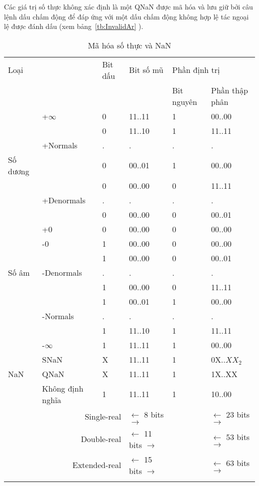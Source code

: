 	Các giá trị số thực không xác định là một QNaN được mã hóa và lưu giữ bởi câu lệnh dấu chấm động để đáp ứng với một dấu chấm động không hợp lệ tác ngoại lệ được đánh dấu (xem bảng~\ref{tb:InvalidAr} ).	
	\newpage
		\begin{longtable}{|l|l|l|l|l|m{2.5cm}|}
			\hline
				\multicolumn{2}{|l|}{Loại} & Bit dấu & Bit số mũ & \multicolumn{2}{l|}{Phần định trị} \\
				\cline{5-6}
				\multicolumn{2}{|l|}{} & & & Bit nguyên & Phần thập phân \\
			\hline
				 & +$\mathbb{\infty}$ & 0 & 11..11 & 1 & 00..00 \\
				\cline{2-6}
				  & & 0 & 11..10 & 1 & 11..11 \\
				  & +Normals & . & .& . & . \\				 
				 Số dương & & 0 & 00..01 & 1 & 00..00 \\
				 	\cline{2-6}
				  & & 0 & 00..00 & 0 & 11..11 \\
				  & +Denormals& . & .& . & . \\				
				  & & 0 & 00..00 & 0 & 00..01 \\
				  \cline{2-6}
				  & +0 & 0& 00..00 & 0 & 00..00 \\
			\hline			
				  & -0 & 1 & 00..00 & 0 & 00..00 \\
				\cline{2-6}
				  & & 1 & 00..00 & 0 & 00..01 \\
				  Số âm& -Denormals& . & .& . & . \\				  
				  & & 1 & 00..00 & 0 & 11..11 \\
				\cline{2-6}
				  & & 1 & 00..01 & 1 & 00..00 \\
				  & -Normals & . & .& . & . \\				 
				  & & 1 & 11..10 & 1 & 11..11 \\
				 \cline{2-6}
				  & -$\mathbb{\infty}$ & 1 & 11..11 & 1 & 00..00 \\
			\hline			
				  & SNaN & X & 11..11 & 1&  0X..$XX_2$ \\
				\cline{2-6}
				 NaN & QNaN & X & 11..11 & 1& 1X..XX\\
				\cline{2-6}
				  & Không định nghĩa &1 & 11..11& 1  &10..00 \\
			\hline
				\multicolumn{3}{r|}{Single-real} & $\leftarrow$ 8 bits $\to $ & & $\leftarrow$ 23 bits $\to $ \\
				\multicolumn{3}{r|}{Double-real} & $\leftarrow$ 11 bits $\to $ & & $\leftarrow$ 53 bits $\to $ \\
				\multicolumn{3}{r|}{Extended-real} & $\leftarrow$ 15 bits $\to $ & & $\leftarrow$ 63 bits $\to $ \\
				\caption{Mã hóa số thực và NaN}
				\label{tb:MaHoaSoThuc}
		\end{longtable}	
	
